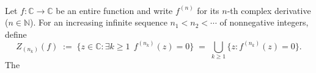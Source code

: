 \\
Let $f:\mathbb{C}\to\mathbb{C}$ be an entire function and write $f^{(n)}$ for its $n$-th complex derivative ($n\in\mathbb{N}$).  For an increasing infinite sequence $n_1<n_2<\cdots$ of nonnegative integers, define
\[
Z_{(n_k)}(f)\;:=\;\big\{z\in\mathbb{C}:\exists k\ge 1\ \ f^{(n_k)}(z)=0\big\}\;=\;\bigcup_{k\ge1} \{z: f^{(n_k)}(z)=0\}.
\]
The
